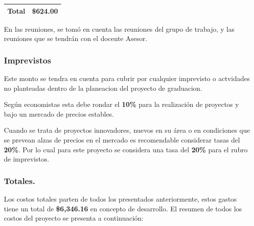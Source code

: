 \documentclass[12pt]{report}%
\begin{document}
\begin{table}[htbp]
\begin{tabular}{|c|c|c|c|c|c|}
\multicolumn{5}{|c|}{{\color[HTML]{000000} \textbf{Total}}}                                                                                                                                                                                                                                                                                                                                                                                                                        & {\color[HTML]{000000} \textbf{\$624.00}}                                                    \\ \hline
\end{tabular}
\end{table}

En las reuniones, se tomó en cuenta las reuniones del grupo de trabajo, y las reuniones que se tendrán con el docente Asesor.

\subsubsection{Imprevistos} 
Este monto se tendra en cuenta para cubrir por cualquier imprevisto o actvidades no planteadas dentro de la planeacion del proyecto de graduacion. 

Según economistas esta debe rondar el \textbf{10\%}  para la realización de proyectos y bajo un mercado de precios estables. 

Cuando se trata de proyectos innovadores, nuevos en su área o en condiciones que se prevean
alzas de precios en el mercado es recomendable considerar tasas del  \textbf{20\%}.  
Por lo cual para este proyecto se considera una tasa del \textbf{20\%}  para el rubro de imprevistos.

\subsubsection{Totales.}  
Los costos totales parten de todos los presentados anteriormente, estos gastos tiene un total de \textbf{\$6,346.16} en concepto de desarrollo.
El resumen de todos los costos del proyecto se presenta a continuación:
\end{document}
